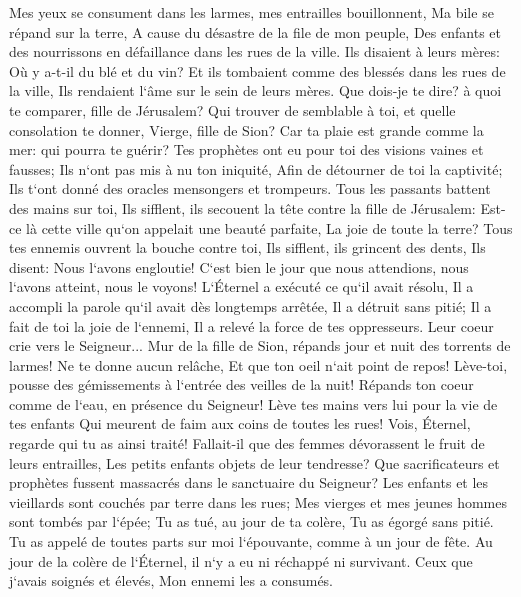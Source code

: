 \verse Mes yeux se consument dans les larmes, mes entrailles bouillonnent, Ma bile se répand sur la terre, A cause du désastre de la file de mon peuple, Des enfants et des nourrissons en défaillance dans les rues de la ville. 
\verse Ils disaient à leurs mères: Où y a-t-il du blé et du vin? Et ils tombaient comme des blessés dans les rues de la ville, Ils rendaient l`âme sur le sein de leurs mères. 
\verse Que dois-je te dire? à quoi te comparer, fille de Jérusalem? Qui trouver de semblable à toi, et quelle consolation te donner, Vierge, fille de Sion? Car ta plaie est grande comme la mer: qui pourra te guérir? 
\verse Tes prophètes ont eu pour toi des visions vaines et fausses; Ils n`ont pas mis à nu ton iniquité, Afin de détourner de toi la captivité; Ils t`ont donné des oracles mensongers et trompeurs. 
\verse Tous les passants battent des mains sur toi, Ils sifflent, ils secouent la tête contre la fille de Jérusalem: Est-ce là cette ville qu`on appelait une beauté parfaite, La joie de toute la terre? 
\verse Tous tes ennemis ouvrent la bouche contre toi, Ils sifflent, ils grincent des dents, Ils disent: Nous l`avons engloutie! C`est bien le jour que nous attendions, nous l`avons atteint, nous le voyons! 
\verse L`Éternel a exécuté ce qu`il avait résolu, Il a accompli la parole qu`il avait dès longtemps arrêtée, Il a détruit sans pitié; Il a fait de toi la joie de l`ennemi, Il a relevé la force de tes oppresseurs. 
\verse Leur coeur crie vers le Seigneur... Mur de la fille de Sion, répands jour et nuit des torrents de larmes! Ne te donne aucun relâche, Et que ton oeil n`ait point de repos! 
\verse Lève-toi, pousse des gémissements à l`entrée des veilles de la nuit! Répands ton coeur comme de l`eau, en présence du Seigneur! Lève tes mains vers lui pour la vie de tes enfants Qui meurent de faim aux coins de toutes les rues! 
\verse Vois, Éternel, regarde qui tu as ainsi traité! Fallait-il que des femmes dévorassent le fruit de leurs entrailles, Les petits enfants objets de leur tendresse? Que sacrificateurs et prophètes fussent massacrés dans le sanctuaire du Seigneur? 
\verse Les enfants et les vieillards sont couchés par terre dans les rues; Mes vierges et mes jeunes hommes sont tombés par l`épée; Tu as tué, au jour de ta colère, Tu as égorgé sans pitié. 
\verse Tu as appelé de toutes parts sur moi l`épouvante, comme à un jour de fête. Au jour de la colère de l`Éternel, il n`y a eu ni réchappé ni survivant. Ceux que j`avais soignés et élevés, Mon ennemi les a consumés. 

